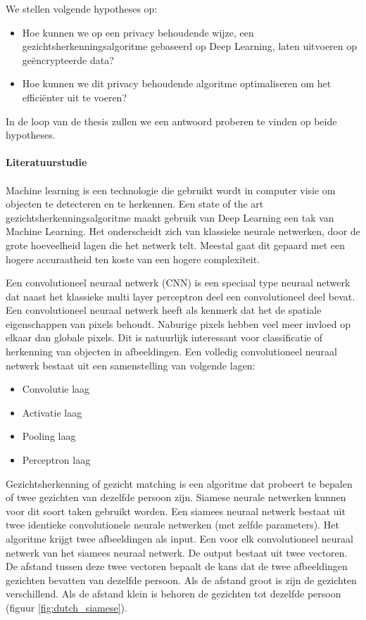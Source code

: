 We stellen volgende hypotheses op:

\begin{itemize}
  \item Hoe kunnen we op een privacy behoudende wijze, een gezichtsherkenningsalgoritme gebaseerd op Deep Learning, laten uitvoeren op ge\"encrypteerde data?
  \item Hoe kunnen we dit privacy behoudende algoritme optimaliseren om het effici\"enter uit te voeren?
\end{itemize}

In de loop van de thesis zullen we een antwoord proberen te vinden op beide hypotheses.\\\\

\textbf{\Large{Literatuurstudie}}\\\\
Machine learning is een technologie die gebruikt wordt in computer visie om objecten te detecteren en te herkennen. Een state of the art gezichtsherkenningsalgoritme maakt gebruik van Deep Learning een tak van Machine Learning. Het onderscheidt zich van klassieke neurale netwerken, door de grote hoeveelheid lagen die het netwerk telt. Meestal gaat dit gepaard met een hogere accuraatheid ten koste van een hogere complexiteit.

Een convolutioneel neuraal netwerk (CNN) is een speciaal type neuraal netwerk dat naast het klassieke multi layer perceptron deel een convolutioneel deel bevat. Een convolutioneel neuraal netwerk heeft als kenmerk dat het de spatiale eigenschappen van pixels behoudt. Naburige pixels hebben veel meer invloed op elkaar dan globale pixels. Dit is natuurlijk interessant voor classificatie of herkenning van objecten in afbeeldingen. Een volledig convolutioneel neuraal netwerk bestaat uit een samenstelling van volgende lagen:

\begin{itemize}
  \item Convolutie laag
  \item Activatie laag
  \item Pooling laag
  \item Perceptron laag
\end{itemize}

Gezichtsherkenning of gezicht matching is een algoritme dat probeert te bepalen of twee gezichten van dezelfde persoon zijn. Siamese neurale netwerken kunnen voor dit soort taken gebruikt worden. Een siamees neuraal netwerk bestaat uit twee identieke convolutionele neurale netwerken (met zelfde parameters). Het algoritme krijgt twee afbeeldingen als input. Een voor elk convolutioneel neuraal netwerk van het siamees neuraal netwerk. De output bestaat uit twee vectoren. De afstand tussen deze twee vectoren bepaalt de kans dat de twee afbeeldingen gezichten bevatten van dezelfde persoon. Als de afstand groot is zijn de gezichten verschillend. Als de afstand klein is behoren de gezichten tot dezelfde persoon (figuur \ref{fig:dutch_siamese}).

